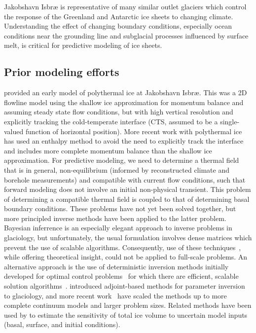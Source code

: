 Jakobshavn Isbr{\ae} is representative of many similar outlet glaciers which control the response of the Greenland and Antarctic ice sheets to changing climate.
Understanding the effect of changing boundary conditions, especially ocean conditions near the grounding line and subglacial processes influenced by surface melt, is critical for predictive modeling of ice sheets.

\subsection{Prior modeling efforts}
\citet{funk1994mechanisms2} provided an early model of polythermal ice at Jakobshavn Isbr{\ae}.
This was a 2D flowline model using the shallow ice approximation for momentum balance and assuming steady state flow conditions, but with high vertical resolution and explicitly tracking the cold-temperate interface (CTS, assumed to be a single-valued function of horizontal position).
More recent work with polythermal ice has used an enthalpy method to avoid the need to explicitly track the interface~\citep[\eg][]{aschwanden2009mma,aschwanden2011enthalpy} and includes more complete momentum balance than the shallow ice approximation.
For predictive modeling, we need to determine a thermal field that is in general, non-equilibrium (informed by reconstructed climate and borehole measurements) and compatible with current flow conditions, such that forward modeling does not involve an initial non-physical transient.
This problem of determining a compatible thermal field is coupled to that of determining basal boundary conditions.
These problems have not yet been solved together, but more principled inverse methods have been applied to the latter problem.
Bayesian inferrence is an especially elegant approach to inverse problems in glaciology, but unfortunately, the usual formulation \citep[\eg][]{tarantola2005ipt} involves dense matrices which prevent the use of scalable algorithms.
Consequently, use of these techniques~\citep{gudmundsson2008limit,raymond2009estimating}, while offering theoretical insight, could not be applied to full-scale problems.
An alternative approach is the use of deterministic inversion methods initially developed for optimal control problems~\citep{bueskens2000sqp} for which there are efficient, scalable solution algorithms~\citep{akcelik2006parallel}.
\citet{macayeal1992basal,macayeal1993tutorial} introduced adjoint-based methods for parameter inversion to glaciology, and more recent work~\citep{johnson2004ice,morlighem2010spatial} have scaled the methods up to more complete continuum models and larger problem sizes.
Related methods have been used by \citet{heimbach2009greenland} to estimate the sensitivity of total ice volume to uncertain model inputs (basal, surface, and initial conditions).
